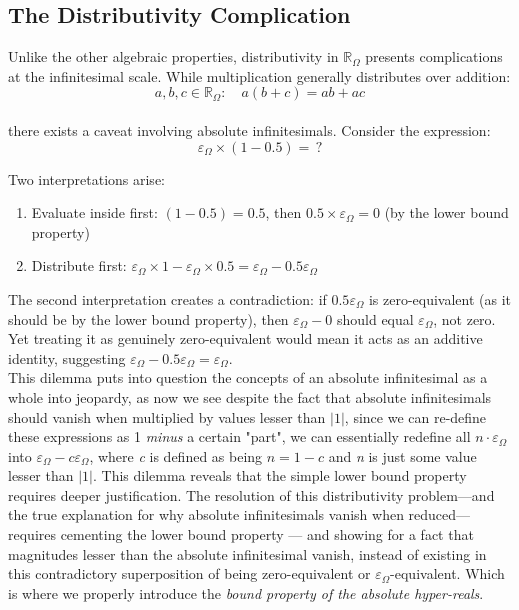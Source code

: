\documentclass{article}
\begin{document}
\subsection{The Distributivity Complication}

Unlike the other algebraic properties, distributivity in $\mathbb{R}_\Omega$ presents complications at the infinitesimal scale. While multiplication generally distributes over addition:
$$a, b, c \in \mathbb{R}_\Omega: \quad a(b + c) = ab + ac$$\\there exists a caveat involving absolute infinitesimals. Consider the expression:
$$\varepsilon_\Omega \times (1 - 0.5) = \, ?$$

Two interpretations arise:
\begin{enumerate}
\item Evaluate inside first: $(1 - 0.5) = 0.5$, then $0.5 \times \varepsilon_\Omega = 0$ (by the lower bound property)
\item Distribute first: $\varepsilon_\Omega \times 1 - \varepsilon_\Omega \times 0.5 = \varepsilon_\Omega - 0.5\varepsilon_\Omega$
\end{enumerate}
The second interpretation creates a contradiction: if $0.5\varepsilon_\Omega$ is zero-equivalent (as it should be by the lower bound property), then $\varepsilon_\Omega - 0$ should equal $\varepsilon_\Omega$, not zero. Yet treating it as genuinely zero-equivalent would mean it acts as an additive identity, suggesting $\varepsilon_\Omega - 0.5\varepsilon_\Omega = \varepsilon_\Omega$.\\This dilemma puts into question the concepts of an absolute infinitesimal as a whole into jeopardy, as now we see despite the fact that absolute infinitesimals should vanish when multiplied by values lesser than $|1|$, since we can re-define these expressions as 1 \textit{minus} a certain "part", we can essentially redefine all $n\cdot\varepsilon_\Omega$ into $\varepsilon_\Omega-c\varepsilon_\Omega$, where \textit{c} is defined as being $n=1-c$ and \textit{n} is just some value lesser than $|1|$. This dilemma reveals that the simple lower bound property requires deeper justification. The resolution of this distributivity problem---and the true explanation for why absolute infinitesimals vanish when reduced---requires cementing the lower bound property --- and showing for a fact that magnitudes lesser than the absolute infinitesimal vanish, instead of existing in this contradictory superposition of being zero-equivalent or $\varepsilon_\Omega$-equivalent. Which is where we properly introduce the \textit{bound property of the absolute hyper-reals}.
\end{document}
